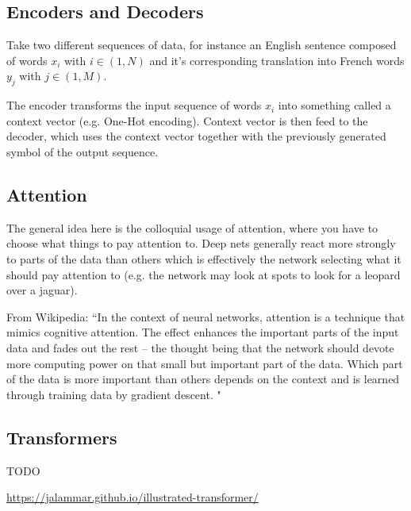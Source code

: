 \subsection{Encoders and Decoders}
Take two different sequences of data, for instance an English sentence composed of words $x_i$ with $i\in (1,N)$ and it's corresponding translation into French words $y_j$ with $j\in(1,M)$.

The encoder transforms the input sequence of words $x_i$ into something called a context vector (e.g. One-Hot encoding). Context vector is then feed to the decoder, which uses the context vector together with the previously generated symbol of the output sequence. 

\subsection{Attention}

The general idea here is the colloquial usage of attention, where you have to choose what things to pay attention to. Deep nets generally react more strongly to parts of the data than others which is effectively the network selecting what it should pay attention to (e.g. the network may look at spots to look for a leopard over a jaguar).



From Wikipedia: ``In the context of neural networks, attention is a technique that mimics cognitive attention. The effect enhances the important parts of the input data and fades out the rest -- the thought being that the network should devote more computing power on that small but important part of the data. Which part of the data is more important than others depends on the context and is learned through training data by gradient descent. "


\subsection{Transformers}
TODO

\url{https://jalammar.github.io/illustrated-transformer/}

